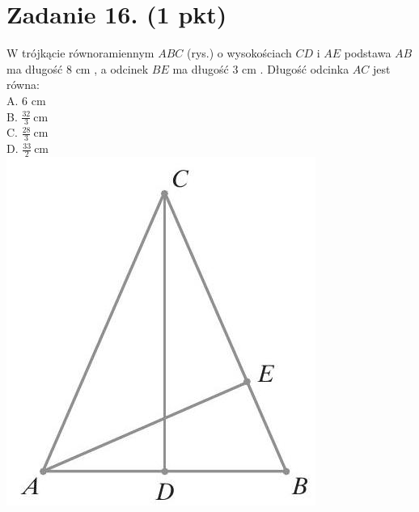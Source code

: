 \documentclass[10pt]{article}
\begin{document}
\section*{Zadanie 16. (1 pkt)}
W trójkącie równoramiennym \(A B C\) (rys.) o wysokościach \(C D\) i \(A E\) podstawa \(A B\) ma długość 8 cm , a odcinek \(B E\) ma długość 3 cm . Długość odcinka \(A C\) jest równa:\\
A. 6 cm\\
B. \(\frac{32}{3} \mathrm{~cm}\)\\
C. \(\frac{28}{3} \mathrm{~cm}\)\\
D. \(\frac{33}{2} \mathrm{~cm}\)\\
\includegraphics[max width=\textwidth, center]{2024_11_21_769d5953f978b92e06f5g-06}
\end{document}
